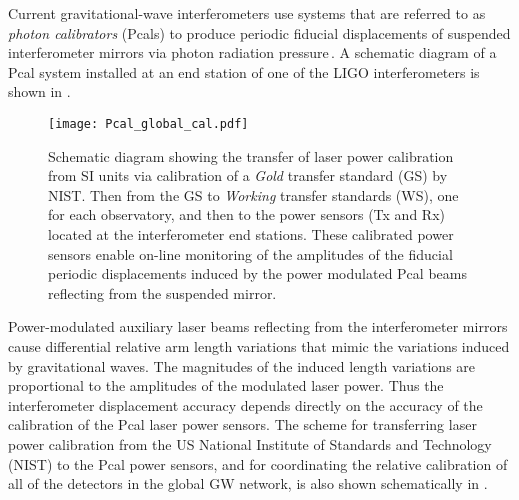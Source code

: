 \documentclass[12pt,a4paper,final]{iopart}
\begin{document}
Current gravitational-wave interferometers use systems that are referred  to as {\em photon calibrators} (Pcals) to produce periodic  fiducial displacements of suspended interferometer mirrors via photon radiation pressure\,\cite{RSIpaper,VirgoPcal,InoueGcal,GEOPcal}.  A schematic diagram of a Pcal system installed at an end station of one of the LIGO interferometers is shown in . 
%
\begin{figure}[t]%
    \begin{center}
    \texttt{[image: Pcal\_global\_cal.pdf]}
    \caption{Schematic diagram showing the transfer of laser power calibration from SI units via calibration of a {\em Gold} transfer standard (GS) by NIST.   Then from the GS to {\em Working}  transfer standards (WS), one for each observatory, and then to the power sensors (Tx and Rx) located at the interferometer end stations. These calibrated power sensors enable on-line monitoring of the amplitudes of the fiducial periodic displacements induced by the power modulated Pcal beams reflecting from the suspended mirror.}
    \label{fig:calib_transfer}
    \end{center}
\end{figure}
%
Power-modulated auxiliary laser beams reflecting from the interferometer mirrors cause differential relative arm length variations that mimic the variations induced by gravitational waves.  The magnitudes of the induced length variations are proportional to the amplitudes of the modulated laser power.  Thus the interferometer displacement accuracy depends directly on the accuracy of the calibration of the Pcal laser power sensors.  The scheme for transferring laser power calibration from the US National Institute of Standards and Technology (NIST) to the Pcal power sensors, and for coordinating the relative calibration of all of the detectors in the global GW network, is also shown schematically in .

%
\end{document}
